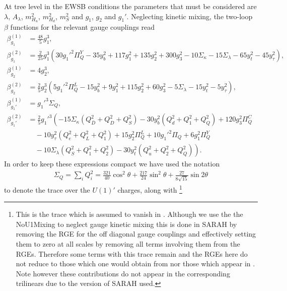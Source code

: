 \documentclass[preprint,amsmath,amssymb,aps,superscriptaddress,prd,showpacs,floatfix,nofootinbib]{revtex4-1}
\begin{document}
At tree level in the EWSB
conditions the parameters that must be considered are $\lambda$,
$A_\lambda$, $m_{H_u}^2$, $m_{H_d}^2$, $m_S^2$ and $g_1$, $g_2$ and
$g_1'$. Neglecting kinetic mixing, the two-loop $\beta$ functions for
the relevant gauge couplings read
\begin{subequations}\label{eq:USSMGaugeBetas}
\begin{align}
\beta_{g_1}^{(1)}&=\frac{48}{5}g_1^3,\label{eq:USSMg1BetaOneLoop}\\
\beta_{g_1}^{(2)}&=\frac{2}{25} g_1^3 \left(30 g_1'^2 \Pi_{Q}^Y-35 y_b^2+117 g_1^2+135 g_2^2+300 g_3^2-10 \Sigma _{\kappa }-15
   \Sigma _{\lambda }-65 y_t^2-45 y_{\tau }^2\right),\label{eq:USSMg1BetaTwoLoop}\\
\beta_{g_2}^{(1)}&=4g_2^3,\label{eq:USSMg2BetaOneLoop}\\
\beta_{g_2}^{(2)}&=\frac{2}{5} g_2^3 \left(5 g_1'^2 \Pi _{Q}^L-15 y_b^2+9 g_1^2+115 g_2^2+60 g_3^2-5 \Sigma _{\lambda }-15
   y_t^2-5 y_{\tau }^2\right),\label{eq:USSMg2BetaTwoLoop}\\
\beta_{g_1'}^{(1)}&=g_1'^3\Sigma_{Q},\label{eq:USSMg1pBetaOneLoop}\\
\beta_{g_1'}^{(2)}&=\frac{2}{5} g_1'^3 \left(-15 \Sigma _{\kappa } \left(Q_{\bar{D}}^2+Q_D^2+Q_S^2\right)-30
   y_b^2 \left(Q_d^2+Q_1^2+Q_Q^2\right)+120 g_3^2 \Pi _{Q}^C\right.\nonumber \\
&\quad{}-10 y_{\tau }^2
   \left(Q_e^2+Q_L^2+Q_1^2\right)+15 g_2^2 \Pi _{Q}^L+10 g_1'^2 \Pi _{Q}+6
   g_1^2 \Pi _{Q}^Y\nonumber\\
&\quad\left.{}-10 \Sigma _{\lambda } \left(Q_S^2+Q_1^2+Q_2^2\right)-30 y_t^2
   \left(Q_u^2+Q_2^2+Q_Q^2\right)\right).\label{eq:USSMg1pBetaTwoLoop}
\end{align}
\end{subequations}
In order to keep these expressions compact we have used the notation
\begin{align*}
\Sigma_{Q}=\sum_i Q_i^2=\frac{321}{40}\cos^2\theta+\frac{217}{24}\sin^2\theta+\frac{27}{8\sqrt{15}}\sin 2\theta
\end{align*}
to denote the trace over the $U(1)'$ charges, along
with \footnote{This is the trace which is assumed to vanish in
  \cite{Martin:1993zk}.  Although we use the the NoU1Mixing to neglect
  gauge kinetic mixing this is done in SARAH by removing the RGE for
  the off diagonal gauge couplings and effectively setting them to
  zero at all scales by removing all terms involving them from the
  RGEs.  Therefore some terms with this trace remain and the RGEs here
  do not reduce to those which one would obtain from
  \cite{Martin:1993zk} nor those which appear in \cite{Athron:2009bs}.
  Note however these contributions do not appear in the
  corresponding trilinears due to the version of SARAH used. }
\end{document}
